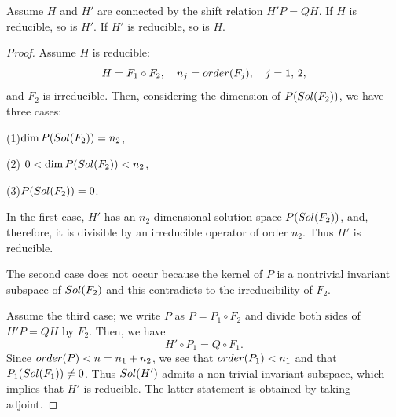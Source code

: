 \documentclass[10pt,a4paper]{amsart}
\begin{document}
\begin{thm}\label{red_atoap}
  Assume $H$ and $H'$ are connected by the shift relation $H'P=QH$.
  If $H$ is reducible, so is $H'$. If $H'$ is reducible, so is $H$.
\end{thm}

\begin{proof}Assume $H$ is reducible:
  \[H=F_1\circ F_2,\quad n_j={\rm order}(F_j),\quad j=1,\, 2,\]
and $F_2$ is irreducible. Then, considering 
the dimension of $P({\rm Sol}(F_2))$, we have three cases:

\smallskip
(1)\quad $\dim P({\rm Sol}(F_2))=n_2$,

\smallskip
(2) \quad $0<\dim P({\rm Sol}(F_2))<n_2$,

\smallskip
(3)\quad $P({\rm Sol}(F_2))=0$.
\smallskip

In the first case, 
$H'$ has an $n_2$-dimensional solution space $P({\rm Sol}(F_2))$, and, therefore, it is divisible by an irreducible operator of order $n_2$. Thus $H'$ is reducible.

The second case does not occur because
the kernel of $P$ is a nontrivial invariant subspace of ${\rm Sol}(F_2)$ and this contradicts to the irreducibility of $F_2$.

Assume the third case; we write $P$ as $P=P_1\circ F_2$
and divide both sides of $H'P=QH$ by $F_2$. Then, we have
  \[H'\circ P_1=Q\circ F_1.\]
Since ${\rm order} (P)<n=n_1+n_2$, we see that
${\rm order} (P_1) < n_1$ and that $P_1({\rm Sol}(F_1))\not=0$.
Thus ${\rm Sol}(H')$ admits a non-trivial invariant subspace,
which implies that $H'$ is reducible.
The latter statement is obtained by taking adjoint. \end{proof}
\end{document}

